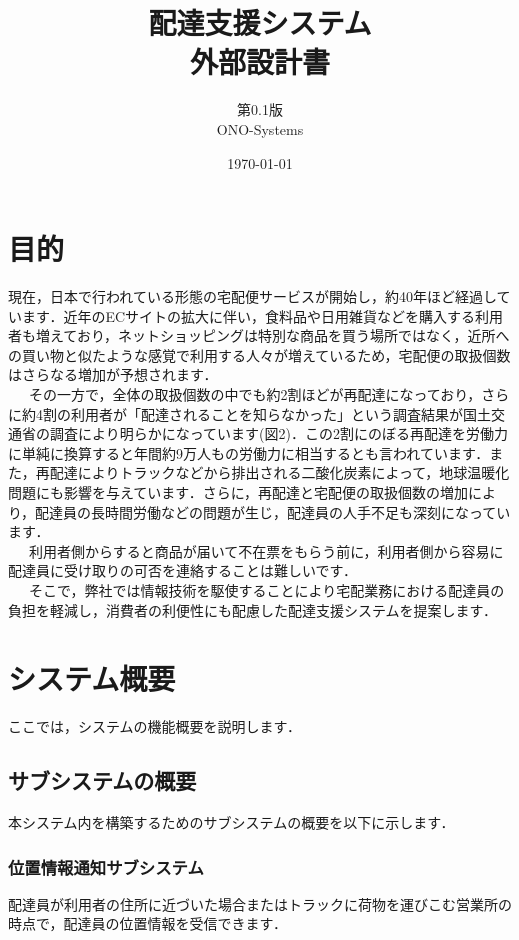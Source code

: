 \documentclass[a4j,titlepage]{jarticle}
\title{\huge 配達支援システム\\
		外部設計書}
\author{第0.1版\\
        ONO-Systems\\}
\date{\today}
\begin{document}
\maketitle

\tableofcontents
\clearpage

\section{目的}
現在，日本で行われている形態の宅配便サービスが開始し，約40年ほど経過しています．近年のECサイトの拡大に伴い，食料品や日用雑貨などを購入する利用者も増えており，ネットショッピングは特別な商品を買う場所ではなく，近所への買い物と似たような感覚で利用する人々が増えているため，宅配便の取扱個数はさらなる増加が予想されます\cite{ref1}．\\
\ \ \ その一方で，全体の取扱個数の中でも約2割ほどが再配達になっており，さらに約4割の利用者が「配達されることを知らなかった」という調査結果が国土交通省の調査により明らかになっています(図2)．この2割にのぼる再配達を労働力に単純に換算すると年間約9万人もの労働力に相当するとも言われています．また，再配達によりトラックなどから排出される二酸化炭素によって，地球温暖化問題にも影響を与えています．さらに，再配達と宅配便の取扱個数の増加により，配達員の長時間労働などの問題が生じ，配達員の人手不足も深刻になっています\cite{ref1}．\\
\ \ \ 利用者側からすると商品が届いて不在票をもらう前に，利用者側から容易に配達員に受け取りの可否を連絡することは難しいです．\\
\ \ \ そこで，弊社では情報技術を駆使することにより宅配業務における配達員の負担を軽減し，消費者の利便性にも配慮した配達支援システムを提案します．

\section{システム概要}
ここでは，システムの機能概要を説明します．

\subsection{サブシステムの概要}
本システム内を構築するためのサブシステムの概要を以下に示します．

\subsubsection{位置情報通知サブシステム}
配達員が利用者の住所に近づいた場合またはトラックに荷物を運びこむ営業所の時点で，配達員の位置情報を受信できます．
\end{document}
